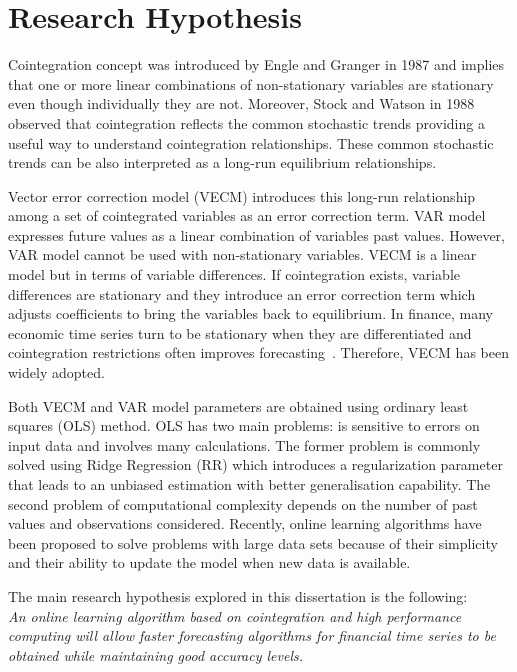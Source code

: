 \section{Research Hypothesis}
Cointegration concept was introduced by Engle and Granger in 1987
\cite{engle1987} and implies that one or more linear combinations of
non-stationary variables are stationary even though individually they are not.
Moreover, Stock and Watson in 1988 \cite{stock+watson1988} observed that
cointegration reflects the common stochastic trends providing a useful way to
understand cointegration relationships. These common stochastic trends can be
also interpreted as a long-run equilibrium relationships.

Vector error correction model (VECM) introduces this long-run relationship
among a set of cointegrated variables as an error correction term. VAR model
expresses future values as a linear combination of variables past values.
However, VAR model cannot be used with non-stationary variables. VECM is a
linear model but in terms of variable differences. If cointegration exists,
variable differences are stationary and they introduce an error correction term
which adjusts coefficients to bring the variables back to equilibrium. In
finance, many economic time series turn to be stationary when they are
differentiated and cointegration restrictions often improves
forecasting~\cite{duy1998}. Therefore, VECM has been widely adopted.

Both VECM and VAR model parameters are obtained using ordinary least squares
(OLS) method. OLS has two main problems: is sensitive to errors on input data
and involves many calculations. The former problem is commonly solved using
Ridge Regression (RR) \cite{hoerl1970} which introduces a regularization
parameter that leads to an unbiased estimation with better generalisation
capability. The second problem of computational complexity depends on the number
of past values and observations considered.  Recently, online learning
algorithms have been proposed to solve problems with large data sets because of
their simplicity and their ability to update the model when new data is
available. 

The main research hypothesis explored in this dissertation is the following:
\\

\textit{An online learning algorithm based on cointegration and high
performance computing will allow faster forecasting
algorithms for financial time series to be obtained while maintaining good accuracy levels.}


